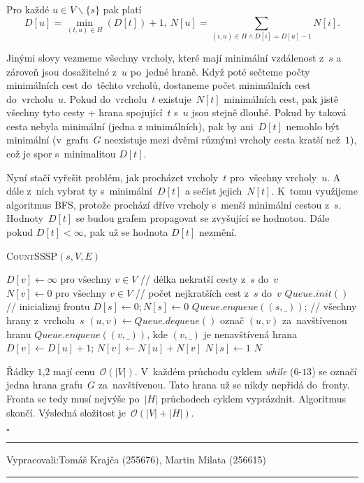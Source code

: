 \documentclass[12pt]{article}
\newcommand{\la}{\leftarrow}
\renewcommand{\O}{\mathcal{O}}
\newcommand{\zadani}[2]{
{\large
\noindent {\bf IB108 \hfill{} Sada #1, Příklad #2 \\[-4mm]}
\noindent\hrule
\vspace{2mm}
\noindent Vypracovali:\hfill{}Tomáš Krajča (255676), Martin Milata (256615)
\vspace{3mm}
\hrule
\bigskip\bigskip}
}
\begin{document}
\noindent
Pro každé $u \in V \smallsetminus \{s\}$ pak platí
$$ D[u] = \min_{(t,u) \in H}(D[t])+1,~N[u] = \sum_{(i,u) \in H \wedge D[i] = D[u]-1} N[i].$$

\noindent
Jinými slovy vezmeme všechny vrcholy, které mají minimální vzdálenost z~$s$ a
zároveň jsou dosažitelné z~$u$ po~jedné hraně. Když poté sečteme počty
minimálních cest do~těchto vrcholů, dostaneme počet minimálních cest do~vrcholu~$u$. Pokud do~vrcholu~$t$ existuje~$N[t]$ minimálních cest, pak jistě všechny
tyto cesty + hrana spojující~$t$ s~$u$ jsou stejně dlouhé. Pokud by taková cesta
nebyla minimální (jedna z minimálních), pak by ani~$D[t]$ nemohlo být minimální
(v~grafu~$G$ neexistuje mezi dvěmi různými vrcholy cesta kratší než~$1$), což je
spor s~minimalitou $D[t]$.

\noindent
Nyní stačí vyřešit problém, jak procházet vrcholy~$t$ pro~všechny vrcholy~$u$. A dále z~nich vybrat ty s~minimální~$D[t]$ a sečíst jejich~$N[t]$. K~tomu
využijeme algoritmus \textsc{BFS}, protože prochází dříve vrcholy s~menší
minimální cestou z~$s$. Hodnoty~$D[t]$ se budou grafem propagovat se
zvyšující se hodnotou. Dále pokud $D[t] < \infty$, pak už se hodnota $D[t]$ nezmění.

\begin{algorithm}
\textsc{CountSSSP}$(s, V, E)$
\begin{algorithmic}[1]
\STATE $D[v] \la \infty \mbox{ pro všechny } v \in V$ // délka nekratší cesty z~$s$ do~$v$
\STATE $N[v] \la 0 \mbox{ pro všechny } v \in V$ // počet nejkratších cest z~$s$ do~$v$
\STATE $Queue.init()$ // inicializuj frontu
\STATE $D[s] \la 0; N[s] \la 0$
\STATE $Queue.enqueue((s,\_))$; // všechny hrany z~vrcholu~$s$
\STATE $(u,v) \la Queue.dequeue()$
\STATE označ $(u,v)$ za~navštívenou hranu
\STATE $Queue.enqueue((v,\_)) \mbox{, kde } (v,\_)$ je nenavštívená hrana
\STATE $D[v] \la D[u]+1$; $N[v] \la N[u] + N[v]$
\ENDIF
\ENDWHILE
\STATE $N[s] \la 1$
\RETURN $N$
\end{algorithmic}
\end{algorithm}

\noindent
Řádky $1$,$2$ mají cenu~$\O(|V|)$. V~každém průchodu cyklem
\textit{while} ($6$-$13$) se označí jedna hrana grafu~$G$ za~navštívenou. Tato
hrana už se nikdy nepřidá do~fronty. Fronta se tedy musí nejvýše po~$|H|$
průchodech cyklem vyprázdnit. Algoritmus skončí. Výsledná složitost je~$\O(|V|+|H|)$.

\hfill$\square$

\clearpage
\zadani{3}{3}
\end{document}
